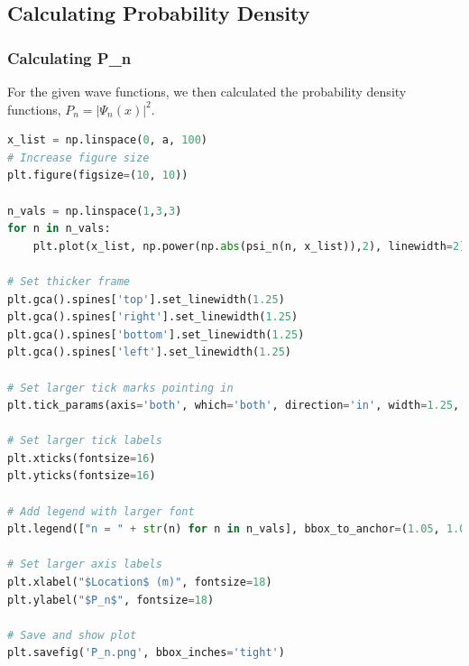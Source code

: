 \documentclass[a4paper,12pt]{article}
\begin{document}
\subsection{Calculating Probability Density}
\subsubsection{Calculating P_n}
For the given wave functions, we then calculated the probability density functions, \(P_n = |\Psi_n(x)|^2\).

\begin{lstlisting}[language=Python, caption= Code used to plot findings]
x_list = np.linspace(0, a, 100)
# Increase figure size
plt.figure(figsize=(10, 10))

n_vals = np.linspace(1,3,3)
for n in n_vals:
    plt.plot(x_list, np.power(np.abs(psi_n(n, x_list)),2), linewidth=2)

# Set thicker frame
plt.gca().spines['top'].set_linewidth(1.25)
plt.gca().spines['right'].set_linewidth(1.25)
plt.gca().spines['bottom'].set_linewidth(1.25)
plt.gca().spines['left'].set_linewidth(1.25)

# Set larger tick marks pointing in
plt.tick_params(axis='both', which='both', direction='in', width=1.25, size = 6)

# Set larger tick labels
plt.xticks(fontsize=16)
plt.yticks(fontsize=16)

# Add legend with larger font
plt.legend(["n = " + str(n) for n in n_vals], bbox_to_anchor=(1.05, 1.0), loc='upper left', fontsize=16)

# Set larger axis labels
plt.xlabel("$Location$ (m)", fontsize=18)
plt.ylabel("$P_n$", fontsize=18)

# Save and show plot
plt.savefig('P_n.png', bbox_inches='tight')
\end{lstlisting}
\end{document}
